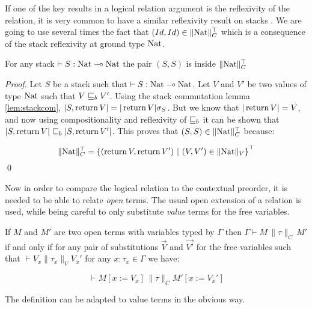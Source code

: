 If one of the key results in 
a logical relation argument is the reflexivity of the relation, 
it is very common to have a similar reflexivity result on stacks \cite{Pitts2000}.
We are going to use several times the fact that $(Id,Id) \in \| \textnormal{Nat} \|_C^\top$
which is a consequence of the stack reflexivity at ground type $\textnormal{Nat}$.

\begin{alemma}
    \label{lem:stackrefl}
    For any stack $\vdash S : \textnormal{Nat} \multimap \textnormal{Nat}$ the pair $(S,S)$ is inside $\| \textnormal{Nat} \|_C^\top$
\end{alemma}

\begin{proof}
    Let $S$ be a stack such that $\vdash S : \textnormal{Nat} \multimap \textnormal{Nat}$. Let 
    $V$ and $V'$ be two values of type $\textnormal{Nat}$ such that $V \sqsubseteq_b V'$.
    Using the stack commutation lemma \ref{lem:stackcom}, $|S, \operatorname{return} V| = |\operatorname{return}
    V| \sigma_S$. But we know that $|\operatorname{return} V| = V$, and now using
    compositionality and reflexivity of $\sqsubseteq_b$ it can be shown 
    that $|S, \operatorname{return} V| \sqsubseteq_b |S, \operatorname{return} V'|$. This proves that $(S,S) \in \| \textnormal{Nat}
    \|_C^\top$ because:

    \begin{equation*}
        \| \textnormal{Nat} \|_C^\top = \left\{ (\operatorname{return} V, \operatorname{return} V') ~|~ (V,V') \in \| \textnormal{Nat} \|_V
        \right\}^\top
    \end{equation*}
\qed\end{proof}

Now in order to compare the logical relation to the contextual preorder,
it is needed to be able to relate \emph{open} terms. The usual 
open extension of a relation is used, while being careful to only 
substitute \emph{value} terms for the free variables.

\begin{adefinition}
    If $M$ and $M'$ are two open terms with variables 
    typed by $\Gamma$ then $\Gamma \vdash M \, \| \tau \|_C \, M'$ if 
    and only if for any pair of substitutions $\vec{V}$ and $\vec{V'}$
    for the free variables such that $\vdash V_x \| \tau_x \|_V V_x'$
    for any $x : \tau_x \in \Gamma$ we have:

    \begin{equation*}
        \vdash M[ x := V_x ] \, \| \tau \|_C M' [ x := V_x' ]
    \end{equation*}

    The definition can be adapted to value terms in the obvious way.
\end{adefinition}


